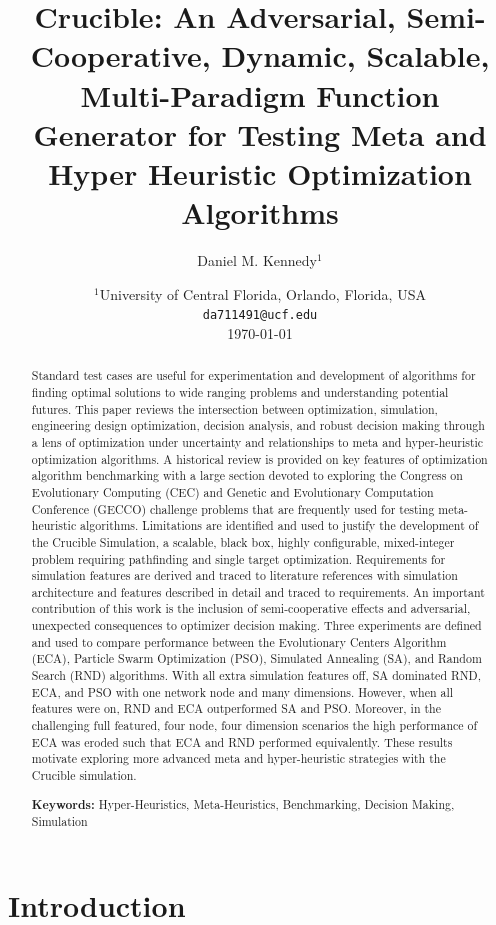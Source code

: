 \documentclass[a4paper]{article}
\title{Crucible: An Adversarial, Semi-Cooperative, Dynamic, Scalable, Multi-Paradigm Function Generator for Testing Meta and Hyper Heuristic Optimization Algorithms }
\author{Daniel M. Kennedy$^1$}
\date{
	$^1$University of Central Florida, Orlando, Florida, USA\\ \texttt{da711491@ucf.edu}\\
	\today
}
\begin{document}
	\maketitle


	\begin{abstract}

Standard test cases are useful for experimentation and development of algorithms for finding optimal solutions to wide ranging problems and understanding potential futures. This paper reviews the intersection between optimization, simulation, engineering design optimization, decision analysis, and robust decision making through a lens of optimization under uncertainty and relationships to meta and hyper-heuristic optimization algorithms. A historical review is provided on key features of optimization algorithm benchmarking with a large section devoted to exploring the Congress on Evolutionary Computing (CEC) and Genetic and Evolutionary Computation Conference (GECCO) challenge problems that are frequently used for testing meta-heuristic algorithms. Limitations are identified and used to justify the development of the Crucible Simulation, a scalable, black box, highly configurable, mixed-integer problem requiring pathfinding and single target optimization. Requirements for simulation features are derived and traced to literature references with simulation architecture and features described in detail and traced to requirements. An important contribution of this work is the inclusion of semi-cooperative effects and adversarial, unexpected consequences to optimizer decision making. Three experiments are defined and used to compare performance between the Evolutionary Centers Algorithm (ECA), Particle Swarm Optimization (PSO), Simulated Annealing (SA), and Random Search (RND) algorithms. With all extra simulation features off, SA dominated RND, ECA, and PSO with one network node and many dimensions. However, when all features were on, RND and ECA outperformed SA and PSO. Moreover, in the challenging full featured, four node, four dimension scenarios the high performance of ECA was eroded such that ECA and RND performed equivalently. These results motivate exploring more advanced meta and hyper-heuristic strategies with the Crucible simulation.
		
		\noindent\textbf{Keywords:} Hyper-Heuristics, Meta-Heuristics, Benchmarking, Decision Making, Simulation
	\end{abstract}


\section{Introduction}
\end{document}
